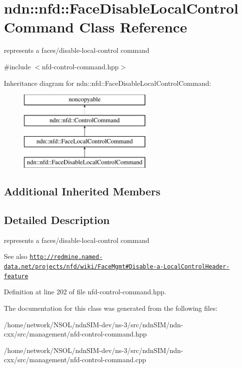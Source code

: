 \hypertarget{classndn_1_1nfd_1_1FaceDisableLocalControlCommand}{}\section{ndn\+:\+:nfd\+:\+:Face\+Disable\+Local\+Control\+Command Class Reference}
\label{classndn_1_1nfd_1_1FaceDisableLocalControlCommand}


represents a faces/disable-\/local-\/control command  




{\ttfamily \#include $<$nfd-\/control-\/command.\+hpp$>$}

Inheritance diagram for ndn\+:\+:nfd\+:\+:Face\+Disable\+Local\+Control\+Command\+:\begin{figure}[H]
\begin{center}
\leavevmode
\includegraphics[height=4.000000cm]{classndn_1_1nfd_1_1FaceDisableLocalControlCommand}
\end{center}
\end{figure}
\subsection*{Additional Inherited Members}


\subsection{Detailed Description}
represents a faces/disable-\/local-\/control command 

\begin{DoxySeeAlso}{See also}
\href{http://redmine.named-data.net/projects/nfd/wiki/FaceMgmt#Disable-a-LocalControlHeader-feature}{\tt http\+://redmine.\+named-\/data.\+net/projects/nfd/wiki/\+Face\+Mgmt\#\+Disable-\/a-\/\+Local\+Control\+Header-\/feature} 
\end{DoxySeeAlso}


Definition at line 202 of file nfd-\/control-\/command.\+hpp.



The documentation for this class was generated from the following files\+:\begin{DoxyCompactItemize}
\item 
/home/network/\+N\+S\+O\+L/ndn\+S\+I\+M-\/dev/ns-\/3/src/ndn\+S\+I\+M/ndn-\/cxx/src/management/nfd-\/control-\/command.\+hpp\item 
/home/network/\+N\+S\+O\+L/ndn\+S\+I\+M-\/dev/ns-\/3/src/ndn\+S\+I\+M/ndn-\/cxx/src/management/nfd-\/control-\/command.\+cpp\end{DoxyCompactItemize}
